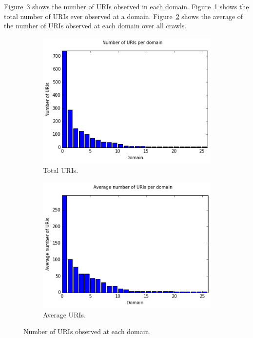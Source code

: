 \documentclass[11pt]{article}
\begin{document}
Figure~\ref{fig:uris_per_domain} shows the number of URIs observed in each domain. Figure~\ref{fig:uris_per_domain:a} shows the total number of URIs ever observed at a domain. Figure~\ref{fig:uris_per_domain:b} shows the average of the number of URIs observed at each domain over all crawls.


\begin{figure}
\centering
\begin{subfigure}{.5\textwidth}
  \centering
  \includegraphics[width=\linewidth]{images/uris_per_domain.png}
  \caption{Total URIs.}
  \label{fig:uris_per_domain:a}
\end{subfigure}%
\begin{subfigure}{.5\textwidth}
  \centering
  \includegraphics[width=\linewidth]{images/avg_uris_per_domain.png}
  \caption{Average URIs.}
  \label{fig:uris_per_domain:b}
\end{subfigure}
\caption{Number of URIs observed at each domain.}
\label{fig:uris_per_domain}
\end{figure}
\end{document}
